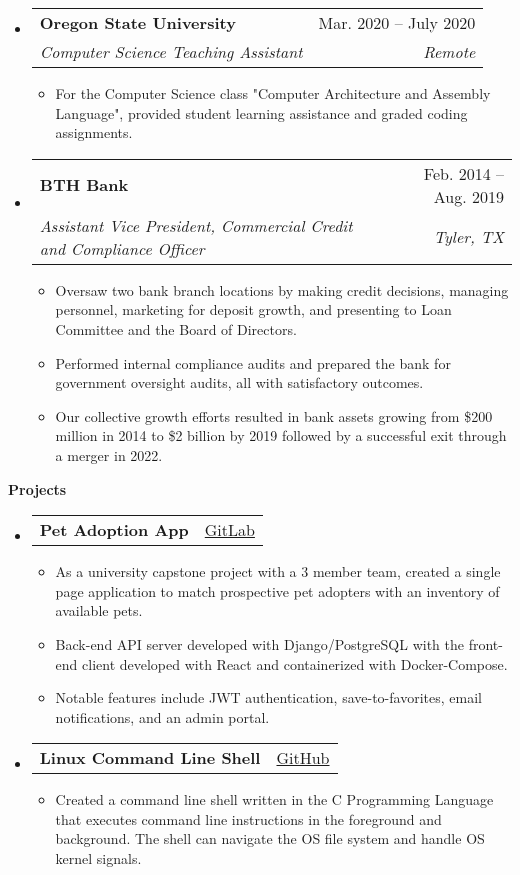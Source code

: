 \documentclass[letterpaper,11.5pt]{article}[leftmargin=*]
\makeatletter
\def \projectatext {GitLab}
\def \projectalink {https://gitlab.com/marc.clinedinst/osu-cs-467}
\def \projectbtext {GitHub}
\def \projectblink {https://github.com/robertjonesdev/CS344-Small-Linux-Shell}
\def \entryspacing {-0pt}
\def \projecta {\href{\projectalink}{\projectatext}}
\def \projectb {\href{\projectblink}{\projectbtext}}
\renewcommand{\section}[2]{\vspace{5pt}
  \colorbox{secondary}{\color{white}\raggedbottom\normalsize\textbf{{#1}{\hspace{7pt}#2}}}
}
\newcommand{\resumeEntryStart}{\begin{itemize}[leftmargin=2.5mm]}
\newcommand{\resumeEntryEnd}{\end{itemize}\vspace{\entryspacing}}
\newcommand{\resumeItemListStart}{\begin{itemize}[leftmargin=4.5mm]}
\newcommand{\resumeItemListEnd}{\end{itemize}}
\newcommand{\resumeItem}[1]{
  \item\small{
    {#1 \vspace{-2pt}}
  }
}
\newcommand{\resumeEntryTSDL}[4]{
  \vspace{-1pt}\item[]
    \begin{tabularx}{0.97\textwidth}{X@{\hspace{60pt}}r}
      \textbf{\color{primary}#1} & {\firabook\color{accent}\small#2} \\
      \textit{\color{accent}\small#3} & \textit{\color{accent}\small#4} \\
    \end{tabularx}\vspace{-6pt}
}
\newcommand{\resumeEntryTD}[2]{
  \vspace{-1pt}\item[]
    \begin{tabularx}{0.97\textwidth}{X@{\hspace{60pt}}r}
      \textbf{\color{primary}#1} & {\firabook\color{accent}\small#2} \\
    \end{tabularx}\vspace{-6pt}
}
\makeatother
\begin{document}
  \resumeEntryStart
    \resumeEntryTSDL
      {Oregon State University}{Mar. 2020 -- July 2020}
      {Computer Science Teaching Assistant}{Remote}
    \resumeItemListStart
      \resumeItem {For the Computer Science class "Computer Architecture and Assembly Language", provided student learning assistance and graded coding assignments.}
    \resumeItemListEnd
  \resumeEntryEnd

  \resumeEntryStart
    \resumeEntryTSDL
      {BTH Bank}{Feb. 2014 -- Aug. 2019}
      {Assistant Vice President, Commercial Credit and Compliance Officer}{Tyler, TX}
    \resumeItemListStart
        \resumeItem {Oversaw two bank branch locations by making credit decisions, managing personnel, marketing for deposit growth, and presenting to Loan Committee and the Board of Directors.}
        \resumeItem {Performed internal compliance audits and prepared the bank for government oversight audits, all with satisfactory outcomes.}
        \resumeItem {Our collective growth efforts resulted in bank assets growing from \$200 million in 2014 to \$2 billion by 2019 followed by a successful exit through a merger in 2022.}
    \resumeItemListEnd
  \resumeEntryEnd

\section{\faFlask}{Projects}

  \resumeEntryStart
    \resumeEntryTD
      {Pet Adoption App}{\projecta}
    \resumeItemListStart
      \resumeItem {As a university capstone project with a 3 member team, created a single page application to match prospective pet adopters with an inventory of available pets.}
      \resumeItem {Back-end API server developed with Django/PostgreSQL with the front-end client developed with React and containerized with Docker-Compose.}
      \resumeItem {Notable features include JWT authentication, save-to-favorites, email notifications, and an admin portal.}
    \resumeItemListEnd
  \resumeEntryEnd

  \resumeEntryStart
    \resumeEntryTD
      {Linux Command Line Shell}{\projectb}
    \resumeItemListStart
      \resumeItem {Created a command line shell written in the C Programming Language that executes command line instructions in the foreground and background. The shell can navigate the OS file system and handle OS kernel signals.}
    \resumeItemListEnd
  \resumeEntryEnd
\end{document}
